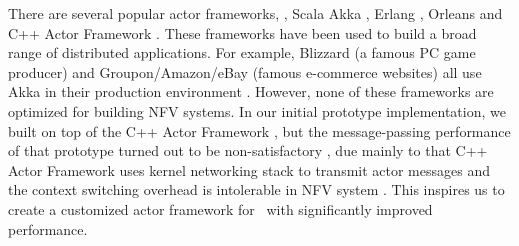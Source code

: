 
There are several popular actor frameworks, \eg, Scala Akka \cite{akka}, Erlang \cite{erlang}, Orleans \cite{Orleans} and C++ Actor Framework \cite{caf}. These frameworks have been used to build a broad range of distributed applications. %
 For example, Blizzard (a famous PC game producer) and Groupon/Amazon/eBay (famous e-commerce websites) all use Akka in their production environment \cite{akka}. However, none of these frameworks are optimized for building NFV systems. In our initial prototype implementation, we built \nfactor on top of the C++ Actor Framework \cite{caf}, but the message-passing performance of that prototype turned out to be non-satisfactory %
 , due mainly to \ac{that C++ Actor Framework uses kernel networking stack to transmit actor messages and the context switching overhead is intolerable in NFV system} \cite{martins2014clickos}. This inspires us to create a customized actor framework for \nfactor~with  significantly improved performance.


